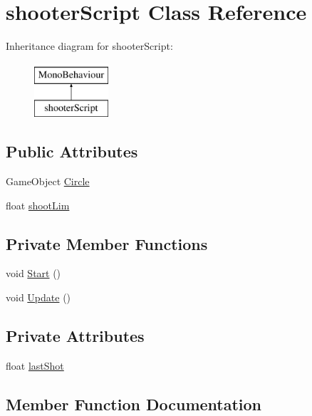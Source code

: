\hypertarget{classshooter_script}{}\section{shooter\+Script Class Reference}
\label{classshooter_script}
Inheritance diagram for shooter\+Script\+:\begin{figure}[H]
\begin{center}
\leavevmode
\includegraphics[height=2.000000cm]{classshooter_script}
\end{center}
\end{figure}
\subsection*{Public Attributes}
\begin{DoxyCompactItemize}
\item 
Game\+Object \hyperlink{classshooter_script_aec5b91ec83c6e5326f9f251f46411367}{Circle}
\item 
float \hyperlink{classshooter_script_a35395b1d291048e31353f9300c4e61be}{shoot\+Lim}
\end{DoxyCompactItemize}
\subsection*{Private Member Functions}
\begin{DoxyCompactItemize}
\item 
void \hyperlink{classshooter_script_a5537eb84985ee1bd03183f66b4f87237}{Start} ()
\item 
void \hyperlink{classshooter_script_a4076123ad3efc3184b433ec934cce1bd}{Update} ()
\end{DoxyCompactItemize}
\subsection*{Private Attributes}
\begin{DoxyCompactItemize}
\item 
float \hyperlink{classshooter_script_a3b49886ffefc2a63ad5cb5995da709b4}{last\+Shot}
\end{DoxyCompactItemize}


\subsection{Member Function Documentation}
\hypertarget{classshooter_script_a5537eb84985ee1bd03183f66b4f87237}{}
